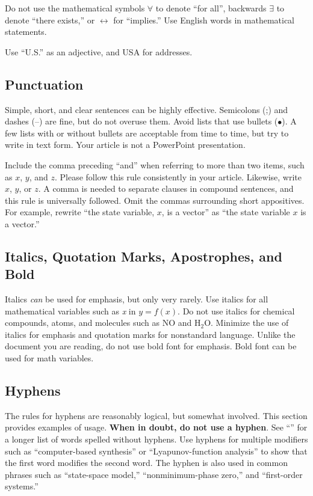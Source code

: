 Do not use the mathematical symbols $\forall$ to denote ``for all'', backwards $\exists$ to denote ``there exists,'' or $\leftrightarrow$ for ``implies.''  Use English words in mathematical statements.

Use ``U.S.'' as an adjective, and USA for addresses.


\subsection{Punctuation}
Simple, short, and clear sentences can be highly effective.  Semicolons (;) and dashes (--) are fine, but do not overuse them.
Avoid lists that use bullets ($\bullet$).  A few lists with or without bullets are acceptable from time to time, but try to write in text form.  Your article is not a PowerPoint presentation.

Include the comma preceding ``and'' when referring to more than two items, such as $x$, $y$, and $z$.  Please follow this rule consistently in your article.  Likewise, write $x$, $y$, or $z$. A comma is needed to separate clauses in compound sentences, and this rule is universally followed.  
%
Omit the commas surrounding short appositives.  For example, rewrite ``the state variable, $x$, is a vector'' as ``the state variable $x$ is a vector.''

\subsection{Italics, Quotation Marks, Apostrophes, and Bold}
Italics \textit{can} be used for emphasis, but only very rarely.  
Use italics for all mathematical variables such as \textit{x} in $y = f(x)$.
%
Do not use italics for chemical compounds, atoms, and molecules such as NO and H$_2$O.
%
Minimize the use of italics for emphasis and quotation marks for nonstandard language. 
%
Unlike the document you are reading, do not use bold font for emphasis.  Bold font can be used for math variables.

\subsection{Hyphens}
The rules for hyphens are reasonably logical, but somewhat involved.  This section provides examples of usage.
\textbf{When in doubt, do not use a hyphen}. See ``'' for a longer list of words spelled without hyphens.
%
Use hyphens for multiple modifiers such as ``computer-based synthesis'' or ``Lyapunov-function analysis'' to show that the first word modifies the second word.  The hyphen is also used in common phrases such as ``state-space model,'' ``nonminimum-phase zero,'' and ``first-order systems.''

